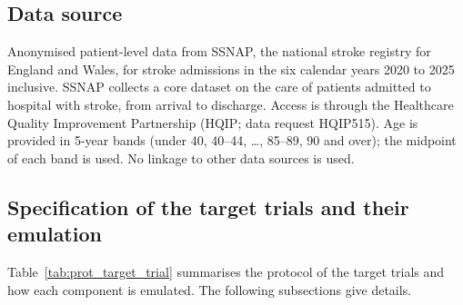 \subsection{Data source}

Anonymised patient-level data from SSNAP, the national stroke registry for England and Wales, for stroke admissions in the six calendar years 2020 to 2025 inclusive\cite{ssnap_website}. SSNAP collects a core dataset on the care of patients admitted to hospital with stroke, from arrival to discharge. Access is through the Healthcare Quality Improvement Partnership (HQIP; data request HQIP515). Age is provided in 5-year bands (under 40, 40--44, \ldots, 85--89, 90 and over); the midpoint of each band is used. No linkage to other data sources is used.

\subsection{Specification of the target trials and their emulation}

Table~\ref{tab:prot_target_trial} summarises the protocol of the target trials and how each component is emulated. The following subsections give details.

